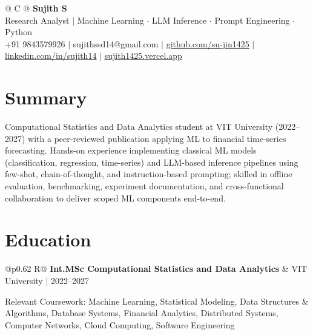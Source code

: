 \documentclass[a4paper,10pt]{article}
\newcommand{\ulink}[2]{\href{#1}{\uline{#2}}}
\newcommand{\subheading}[1]{{\color[HTML]{0A0A0A}\fontsize{12}{14}\selectfont\bfseries #1}}
\newcommand{\meta}[1]{{\color[HTML]{5C5C5C}\fontsize{10.5}{12.5}\selectfont #1}}
\begin{document}
\pagestyle{empty}

\begin{tabularx}{\linewidth}{@{} C @{}}
{\color[HTML]{000000}\fontsize{30}{35}\selectfont\bfseries Sujith S} \\[5pt]
{\fontsize{10.5}{12.5}\selectfont\color[HTML]{3A3A3A}
Research Analyst $|$ Machine Learning $\cdot$ LLM Inference $\cdot$ Prompt Engineering $\cdot$ Python} \\[6pt]
{\fontsize{10.5}{12.5}\selectfont\textcolor[HTML]{3A3A3A}{
+91 9843579926 $|$
sujithssd14@gmail.com $|$
\ulink{https://github.com/su-jin1425}{github.com/su-jin1425} $|$
\ulink{https://linkedin.com/in/sujith14}{linkedin.com/in/sujith14} $|$
\ulink{https://sujith1425.vercel.app}{sujith1425.vercel.app}}}
\end{tabularx}

\vspace{2pt}

\section{Summary}
\vspace{2pt}
{\color[HTML]{0A0A0A}\fontsize{11}{14}\selectfont
Computational Statistics and Data Analytics student at VIT University (2022--2027) with a peer-reviewed publication applying ML to financial time-series forecasting. Hands-on experience implementing classical ML models (classification, regression, time-series) and LLM-based inference pipelines using few-shot, chain-of-thought, and instruction-based prompting; skilled in offline evaluation, benchmarking, experiment documentation, and cross-functional collaboration to deliver scoped ML components end-to-end.}

\vspace{2pt}

\section{Education}
\vspace{2pt}

\begin{tabularx}{\linewidth}{@{}p{0.62\linewidth} R@{}}
\subheading{Int.MSc Computational Statistics and Data Analytics} & \meta{VIT University $|$ 2022--2027}
\end{tabularx}
\vspace{2pt}
{\color[HTML]{3A3A3A}\fontsize{11}{14}\selectfont Relevant Coursework: Machine Learning, Statistical Modeling, Data Structures \& Algorithms, Database Systems, Financial Analytics, Distributed Systems, Computer Networks, Cloud Computing, Software Engineering}
\end{document}
